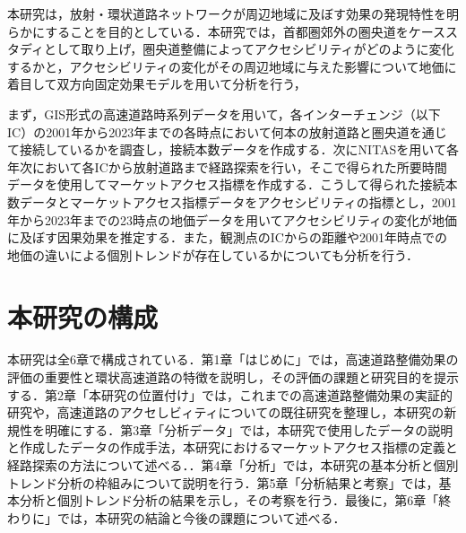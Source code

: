 本研究は，放射・環状道路ネットワークが周辺地域に及ぼす効果の発現特性を明らかにすることを目的としている．本研究では，首都圏郊外の圏央道をケーススタディとして取り上げ，圏央道整備によってアクセシビリティがどのように変化するかと，アクセシビリティの変化がその周辺地域に与えた影響について地価に着目して双方向固定効果モデルを用いて分析を行う，

まず，GIS形式の高速道路時系列データを用いて，各インターチェンジ（以下IC）の2001年から2023年までの各時点において何本の放射道路と圏央道を通じて接続しているかを調査し，接続本数データを作成する．次にNITASを用いて各年次において各ICから放射道路まで経路探索を行い，そこで得られた所要時間データを使用してマーケットアクセス指標を作成する．こうして得られた接続本数データとマーケットアクセス指標データをアクセシビリティの指標とし，2001年から2023年までの23時点の地価データを用いてアクセシビリティの変化が地価に及ぼす因果効果を推定する．また，観測点のICからの距離や2001年時点での地価の違いによる個別トレンドが存在しているかについても分析を行う．

\section{本研究の構成}

本研究は全6章で構成されている．第1章「はじめに」では，高速道路整備効果の評価の重要性と環状高速道路の特徴を説明し，その評価の課題と研究目的を提示する．第2章「本研究の位置付け」では，これまでの高速道路整備効果の実証的研究や，高速道路のアクセしビィティについての既往研究を整理し，本研究の新規性を明確にする．第3章「分析データ」では，本研究で使用したデータの説明と作成したデータの作成手法，本研究におけるマーケットアクセス指標の定義と経路探索の方法について述べる．．第4章「分析」では，本研究の基本分析と個別トレンド分析の枠組みについて説明を行う．第5章「分析結果と考察」では，基本分析と個別トレンド分析の結果を示し，その考察を行う．最後に，第6章「終わりに」では，本研究の結論と今後の課題について述べる．


